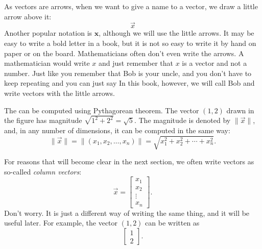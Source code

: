 \begin{myfig}
\capstart
{}
\caption{The vector $(1,2)$ drawn as an arrow from the origin to the point
$(1,2)$.\label{linalg-vecarrow:fig}}
\end{myfig}

As vectors are arrows, when we want to give a name to a vector,
we draw a little arrow above it:
\begin{equation*}
\vec{x}
\end{equation*}
Another popular notation is $\mathbf{x}$, although we will use the little
arrows.  It may be easy to write a bold letter in a book, but it is not so
easy to write it by hand on paper or on the board.
Mathematicians often don't even write the arrows.  A mathematician would
write $x$ and just remember that $x$ is a vector and not a number.
Just like you remember that Bob is your uncle, and you don't have to
keep repeating  and you can just say 
In this book, however, we will call Bob 
and write vectors with the little arrows.

The \emph{} can be computed using Pythagorean theorem.
The vector $(1,2)$ drawn in the figure has magnitude $\sqrt{1^2+2^2} =
\sqrt{5}$.  The magnitude is denoted by $\lVert \vec{x} \rVert$,
and, in any number of dimensions, it can be computed in the same way:
\begin{equation*}
\lVert \vec{x} \rVert
=
\lVert (x_1,x_2,\ldots,x_n) \rVert
=
\sqrt{x_1^2+x_2^2+\cdots+x_n^2} .
\end{equation*}

For reasons that will become clear in the next section, we often
write vectors as so-called
\emph{column vectors}:
\begin{equation*}
\vec{x} = 
\begin{bmatrix}
x_{1} \\ x_2 \\ \vdots \\ x_n
\end{bmatrix} .
\end{equation*}
Don't worry.  It is just a different way of writing the same thing, and
it will be useful later.  For example, the vector $(1,2)$ can be written as
\begin{equation*}
\begin{bmatrix}
1 \\ 2
\end{bmatrix} .
\end{equation*}

